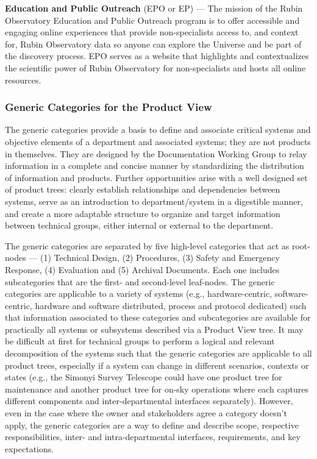\textbf{Education and Public Outreach} (EPO or EP) ---
The mission of the Rubin Observatory Education and Public Outreach program is to offer accessible and engaging online experiences that provide non-specialists access to, and context for, Rubin Observatory data so anyone can explore the Universe and be part of the discovery process.
EPO serves as a website that highlights and contextualizes the scientific power of Rubin Observatory for non-specialists and hosts all online resources.

\subsubsection{Generic Categories for the Product View}

The generic categories provide a basis to define and associate critical systems and objective elements of a department and associated systems; they are not products in themselves.
They are designed by the Documentation Working Group to relay information in a complete and concise manner by standardizing the distribution of information and products.
Further opportunities arise with a well designed set of product trees: clearly establish relationships and dependencies between systems, serve as an introduction to department/system in a digestible manner, and create a more adaptable structure to organize and target information between technical groups, either internal or external to the department.

The generic categories are separated by five high-level categories that act as root-nodes --- (1) Technical Design, (2) Procedures, (3) Safety and Emergency Response, (4) Evaluation and (5) Archival Documents.
Each one includes subcategories that are the first- and second-level leaf-nodes.
The generic categories are applicable to a variety of systems (e.g., hardware-centric, software-centric, hardware and software distributed, process and protocol dedicated) such that information associated to these categories and subcategories are available for practically all systems or subsystems described via a Product View tree.
It may be difficult at first for technical groups to perform a logical and relevant decomposition of the systems such that the generic categories are applicable to all product trees, especially if a system can change in different scenarios, contexts or states (e.g., the Simonyi Survey Telescope could have one product tree for maintenance and another product tree for on-sky operations where each captures different components and inter-departmental interfaces separately).
However, even in the case where the owner and stakeholders agree a category doesn't apply, the generic categories are a way to define and describe scope, respective responsibilities, inter- and intra-departmental interfaces, requirements, and key expectations.

